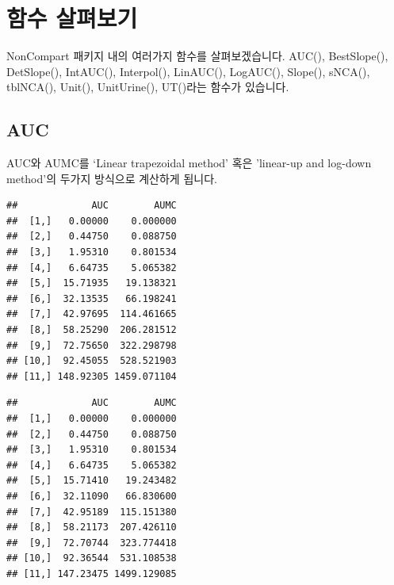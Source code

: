 \documentclass[12pt,]{krantz}
\newenvironment{Shaded}{\begin{snugshade}}{\end{snugshade}}
\newcommand{\DataTypeTok}[1]{\textcolor[rgb]{0.13,0.29,0.53}{#1}}
\newcommand{\DecValTok}[1]{\textcolor[rgb]{0.00,0.00,0.81}{#1}}
\newcommand{\KeywordTok}[1]{\textcolor[rgb]{0.13,0.29,0.53}{\textbf{#1}}}
\newcommand{\NormalTok}[1]{#1}
\newcommand{\OperatorTok}[1]{\textcolor[rgb]{0.81,0.36,0.00}{\textbf{#1}}}
\newcommand{\StringTok}[1]{\textcolor[rgb]{0.31,0.60,0.02}{#1}}
\begin{document}
\hypertarget{functions}{%
\section{함수 살펴보기}\label{functions}}

NonCompart 패키지 내의 여러가지 함수를 살펴보겠습니다. AUC(), BestSlope(), DetSlope(), IntAUC(), Interpol(), LinAUC(), LogAUC(), Slope(), sNCA(), tblNCA(), Unit(), UnitUrine(), UT()라는 함수가 있습니다.

\hypertarget{auc}{%
\subsection{AUC}\label{auc}}

AUC와 AUMC를 `Linear trapezoidal method' 혹은 'linear-up and log-down method'의 두가지 방식으로 계산하게 됩니다.

\begin{Shaded}
\end{Shaded}

\begin{verbatim}
##             AUC        AUMC
##  [1,]   0.00000    0.000000
##  [2,]   0.44750    0.088750
##  [3,]   1.95310    0.801534
##  [4,]   6.64735    5.065382
##  [5,]  15.71935   19.138321
##  [6,]  32.13535   66.198241
##  [7,]  42.97695  114.461665
##  [8,]  58.25290  206.281512
##  [9,]  72.75650  322.298798
## [10,]  92.45055  528.521903
## [11,] 148.92305 1459.071104
\end{verbatim}

\begin{Shaded}
\end{Shaded}

\begin{verbatim}
##             AUC        AUMC
##  [1,]   0.00000    0.000000
##  [2,]   0.44750    0.088750
##  [3,]   1.95310    0.801534
##  [4,]   6.64735    5.065382
##  [5,]  15.71410   19.243482
##  [6,]  32.11090   66.830600
##  [7,]  42.95189  115.151380
##  [8,]  58.21173  207.426110
##  [9,]  72.70744  323.774418
## [10,]  92.36544  531.108538
## [11,] 147.23475 1499.129085
\end{verbatim}
\end{document}
